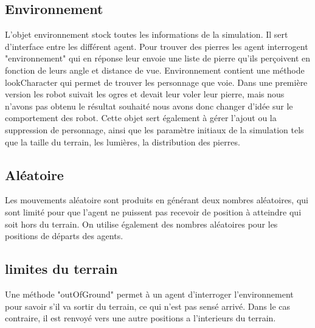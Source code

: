 \subsection{Environnement}
L'objet environnement stock toutes les informations de la simulation. Il sert d'interface entre les différent agent. Pour trouver des pierres les agent interrogent "environnement" qui en réponse leur envoie une liste de pierre qu'ils perçoivent en fonction de leurs angle et distance de vue. Environnement contient une méthode lookCharacter qui permet de trouver les personnage que voie. Dans une première version les robot suivait les ogres et devait leur voler leur pierre, mais nous n'avons pas obtenu le résultat souhaité nous avons donc changer d'idée sur le comportement des robot.
Cette objet sert également à gérer l'ajout ou la suppression de personnage, ainsi que les paramètre initiaux de la simulation tels que la taille du terrain, les lumières, la distribution des pierres. 
\subsection{Aléatoire}
Les mouvements aléatoire sont produits en générant deux nombres
aléatoires, qui sont limité pour que l'agent ne puissent pas recevoir
de position à atteindre qui soit hors du terrain.  On utilise
également des nombres aléatoires pour les positions de départs des
agents.

\subsection{limites du terrain}

Une méthode "outOfGround" permet à un agent d'interroger
l'environnement pour savoir s'il va sortir du terrain, ce qui n'est
pas sensé arrivé. Dans le cas contraire, il est renvoyé vers une autre
positions a l'interieurs du terrain.
